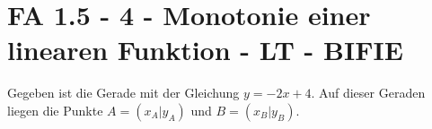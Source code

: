 \section{FA 1.5 - 4 - Monotonie einer linearen Funktion - LT - BIFIE}

\begin{beispiel}[FA 1.5]{1} %
Gegeben ist die Gerade mit der Gleichung $y = -2x + 4$. Auf dieser Geraden liegen die Punkte $A = (x_A|y_A)$ und $B = (x_B|y_B)$. \leer

\end{beispiel}